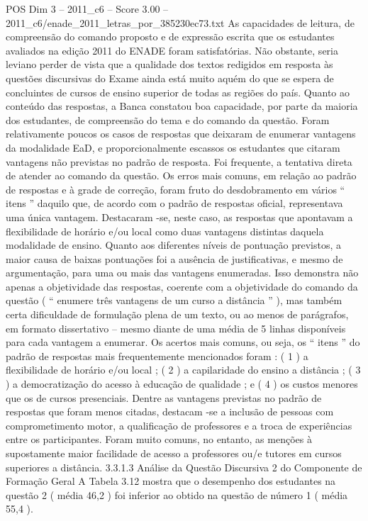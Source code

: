 \begin{textsample}{POS Dim 3 – 2011\_c6 – Score 3.00 – 2011\_c6/enade\_2011\_letras\_por\_385230ec73.txt}
As capacidades de leitura, de compreensão do comando proposto e de expressão escrita que os estudantes avaliados na edição 2011 do ENADE foram satisfatórias.
Não obstante, seria leviano perder de vista que a qualidade dos textos redigidos em resposta às questões discursivas do Exame ainda está muito aquém do que se espera de concluintes de cursos de ensino superior de todas as regiões do país.
Quanto ao conteúdo das respostas, a Banca constatou boa capacidade, por parte da maioria dos estudantes, de compreensão do tema e do comando da questão.
Foram relativamente poucos os casos de respostas que deixaram de enumerar vantagens da modalidade EaD, e proporcionalmente escassos os estudantes que citaram vantagens não previstas no padrão de resposta.
Foi frequente, a tentativa direta de atender ao comando da questão.
Os erros mais comuns, em relação ao padrão de respostas e à grade de correção, foram fruto do desdobramento em vários “ itens ” daquilo que, de acordo com o padrão de respostas oficial, representava uma única vantagem.
Destacaram -se, neste caso, as respostas que apontavam a flexibilidade de horário e/ou local como duas vantagens distintas daquela modalidade de ensino.
Quanto aos diferentes níveis de pontuação previstos, a maior causa de baixas pontuações foi a ausência de justificativas, e mesmo de argumentação, para uma ou mais das vantagens enumeradas.
Isso demonstra não apenas a objetividade das respostas, coerente com a objetividade do comando da questão ( “ enumere três vantagens de um curso a distância ” ), mas também certa dificuldade de formulação plena de um texto, ou ao menos de parágrafos, em formato dissertativo – mesmo diante de uma média de 5 linhas disponíveis para cada vantagem a enumerar.
Os acertos mais comuns, ou seja, os “ itens ” do padrão de respostas mais frequentemente mencionados foram : ( 1 ) a flexibilidade de horário e/ou local ; ( 2 ) a capilaridade do ensino a distância ; ( 3 ) a democratização do acesso à educação de qualidade ; e ( 4 ) os custos menores que os de cursos presenciais.
Dentre as vantagens previstas no padrão de respostas que foram menos citadas, destacam -se a inclusão de pessoas com comprometimento motor, a qualificação de professores e a troca de experiências entre os participantes.
Foram muito comuns, no entanto, as menções à supostamente maior facilidade de acesso a professores ou/e tutores em cursos superiores a distância. 3.3.1.3 Análise da Questão Discursiva 2 do Componente de Formação Geral A Tabela 3.12 mostra que o desempenho dos estudantes na questão 2 ( média 46,2 ) foi inferior ao obtido na questão de número 1 ( média 55,4 ).

\end{textsample}

